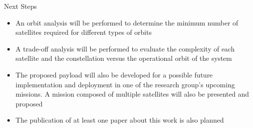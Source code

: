 %
%
%
%
%

%
%
%
%
%

\begin{frame}{Next Steps}

    \begin{itemize}
        \item An orbit analysis will be performed to determine the minimum number of satellites required for different types of orbits
        \vspace{0.1cm}
        \item A trade-off analysis will be performed to evaluate the complexity of each satellite and the constellation versus the operational orbit of the system
        \vspace{0.1cm}
        \item The proposed payload will also be developed for a possible future implementation and deployment in one of the research group's upcoming missions. A mission composed of multiple satellites will also be presented and proposed
        \vspace{0.1cm}
        \item The publication of at least one paper about this work is also planned
    \end{itemize}

\end{frame}
